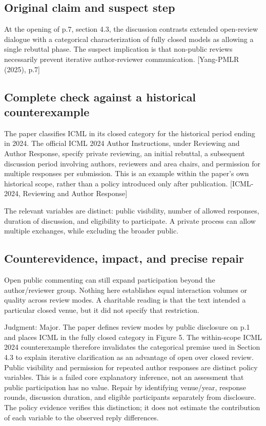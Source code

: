 \documentclass[10pt]{article}
\begin{document}
\subsection*{Original claim and suspect step}
At the opening of p.7, section 4.3, the discussion contrasts extended open-review dialogue with a categorical characterization of fully closed models as allowing a single rebuttal phase. The suspect implication is that non-public reviews necessarily prevent iterative author-reviewer communication. [Yang-PMLR (2025), p.7]\par
\subsection*{Complete check against a historical counterexample}
The paper classifies ICML in its closed category for the historical period ending in 2024. The official ICML 2024 Author Instructions, under Reviewing and Author Response, specify private reviewing, an initial rebuttal, a subsequent discussion period involving authors, reviewers and area chairs, and permission for multiple responses per submission. This is an example within the paper’s own historical scope, rather than a policy introduced only after publication. [ICML-2024, Reviewing and Author Response]\par
The relevant variables are distinct: public visibility, number of allowed responses, duration of discussion, and eligibility to participate. A private process can allow multiple exchanges, while excluding the broader public.\par
\subsection*{Counterevidence, impact, and precise repair}
Open public commenting can still expand participation beyond the author/reviewer group. Nothing here establishes equal interaction volumes or quality across review modes. A charitable reading is that the text intended a particular closed venue, but it did not specify that restriction.\par
Judgment: Major. The paper defines review modes by public disclosure on p.1 and places ICML in the fully closed category in Figure 5. The within-scope ICML 2024 counterexample therefore invalidates the categorical premise used in Section 4.3 to explain iterative clarification as an advantage of open over closed review. Public visibility and permission for repeated author responses are distinct policy variables. This is a failed core explanatory inference, not an assessment that public participation has no value. Repair by identifying venue/year, response rounds, discussion duration, and eligible participants separately from disclosure. The policy evidence verifies this distinction; it does not estimate the contribution of each variable to the observed reply differences.\par
\end{document}

